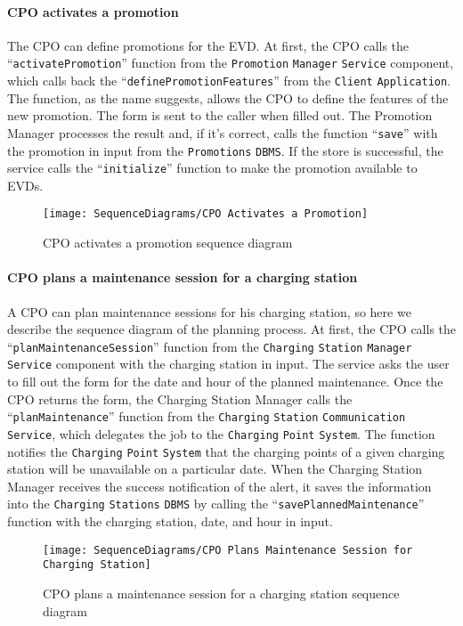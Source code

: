 \paragraph{CPO activates a promotion}
The CPO can define promotions for the EVD\@.
At first, the CPO calls the ``\verb|activatePromotion|'' function from the \verb|Promotion| \verb|Manager| \verb|Service| component, which calls back the ``\verb|definePromotionFeatures|'' from the \verb|Client| \verb|Application|.
The function, as the name suggests, allows the CPO to define the features of the new promotion.
The form is sent to the caller when filled out.
The Promotion Manager processes the result and, if it's correct, calls the function ``\verb|save|'' with the promotion in input from the \verb|Promotions| \verb|DBMS|\@.
If the store is successful, the service calls the ``\verb|initialize|'' function to make the promotion available to EVDs\@.
\begin{figure}[H]
    \begin{center}
        \texttt{[image: SequenceDiagrams/CPO Activates a Promotion]}
        \caption{CPO activates a promotion sequence diagram}
        \label{cpo_activates_promotion}
    \end{center}
\end{figure}

\paragraph{CPO plans a maintenance session for a charging station}
A CPO can plan maintenance sessions for his charging station, so here we describe the sequence diagram of the planning process.
At first, the CPO calls the ``\verb|planMaintenanceSession|'' function from the \verb|Charging| \verb|Station| \verb|Manager| \verb|Service| component with the charging station in input.
The service asks the user to fill out the form for the date and hour of the planned maintenance.
Once the CPO returns the form, the Charging Station Manager calls the ``\verb|planMaintenance|'' function from the \verb|Charging| \verb|Station| \verb|Communication| \verb|Service|, which delegates the job to the \verb|Charging| \verb|Point| \verb|System|.
The function notifies the \verb|Charging| \verb|Point| \verb|System| that the charging points of a given charging station will be unavailable on a particular date.
When the Charging Station Manager receives the success notification of the alert, it saves the information into the \verb|Charging| \verb|Stations| \verb|DBMS| by calling the ``\verb|savePlannedMaintenance|'' function with the charging station, date, and hour in input.
\begin{figure}[H]
    \begin{center}
        \texttt{[image: SequenceDiagrams/CPO Plans Maintenance Session for Charging Station]}
        \caption{CPO plans a maintenance session for a charging station sequence diagram}
        \label{cpo_plans_maintenance_session_for_charging_station}
    \end{center}
\end{figure}

